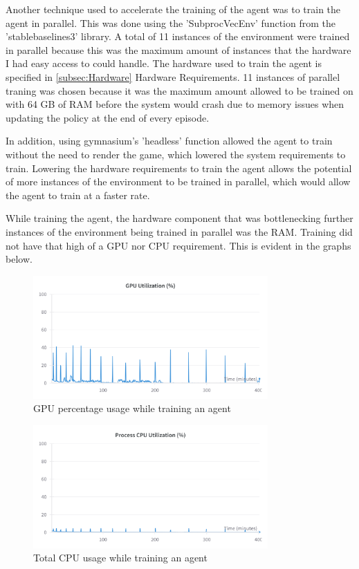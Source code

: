 Another technique used to accelerate the training of the agent was to train the agent in parallel. This was done using the 'SubprocVecEnv' function from the 'stablebaselines3' library. A total of 11 instances of the environment were trained in parallel because this was the maximum amount of instances that the hardware I had easy access to could handle. The hardware used to train the agent is specified in \ref{subsec:Hardware} Hardware Requirements. 11 instances of parallel traning was chosen because it was the maximum amount allowed to be trained on with 64 GB of RAM before the system would crash due to memory issues when updating the policy at the end of every episode. 

In addition, using gymnasium's 'headless' function allowed the agent to train without the need to render the game, which lowered the system requirements to train. Lowering the hardware requirements to train the agent allows the potential of more instances of the environment to be trained in parallel, which would allow the agent to train at a faster rate.

While training the agent, the hardware component that was bottlenecking further instances of the environment being trained in parallel was the RAM. Training did not have that high of a GPU nor CPU requirement. This is evident in the graphs below. 

\begin{figure}[H]
    \centering
    \includegraphics[width=0.8\textwidth]{figures/GPU_Utilization.png}
    \caption{GPU percentage usage while training an agent}
    \label{fig:gpu_memory_usage}
\end{figure}

\begin{figure}[H]
    \centering
    \includegraphics[width=0.8\textwidth]{figures/total_cpu_utilization.png}
    \caption{Total CPU usage while training an agent}
    \label{fig:ram_usage}
\end{figure}

